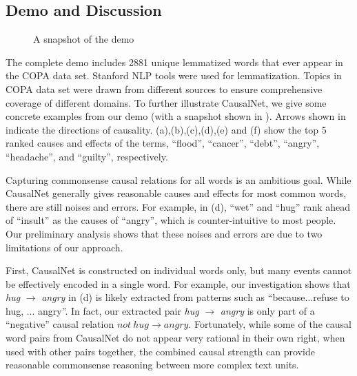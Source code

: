 
\subsection{Demo and Discussion}
\label{sec:discuss}
\begin{figure}[th]
\centering
{}
\caption{A snapshot of the demo}
\label{fig:snapshot}
\end{figure}

The complete demo includes 2881 unique lemmatized words that ever appear
in the COPA data set. Stanford NLP tools \cite{chen2014fast} were used for
lemmatization. Topics in COPA data set were drawn from
different sources\cite{roemmele2011choice} to ensure comprehensive coverage
of different domains.
To further illustrate CausalNet, we give some concrete
examples from our demo (with a snapshot shown in ).
Arrows shown in
 indicate the directions of causality.
 (a),(b),(c),(d),(e) and (f) show the top 5 ranked
causes and effects of the terms, ``flood'', ``cancer'', ``debt'',
``angry'', ``headache'', and ``guilty'', respectively.

Capturing commonsense causal relations for all words is
an ambitious goal.
While CausalNet generally gives reasonable causes and effects
for most common words,
there are still noises and errors.
For example, in  (d), ``wet'' and ``hug'' rank ahead of
``insult'' as the causes of ``angry'', which is counter-intuitive to most
people.
Our preliminary analysis shows that these noises and errors are due to
two limitations of our approach.

First, CausalNet is constructed on individual words only, but many events
cannot be effectively encoded in a single word. For example, our investigation
shows that \emph{hug} $\rightarrow$ \emph{angry} in  (d)
is likely extracted from patterns such as
``because...refuse to hug, ... angry''. In fact, our extracted pair
 \emph{hug} $\rightarrow$ \emph{angry} is only part of a ``negative''
causal relation $not~ hug \rightarrow angry$. Fortunately, while some
of the causal word pairs from CausalNet do not appear very rational in their
own right, when used with other pairs together,
the combined causal strength can provide
reasonable commonsense reasoning between more complex text units.

